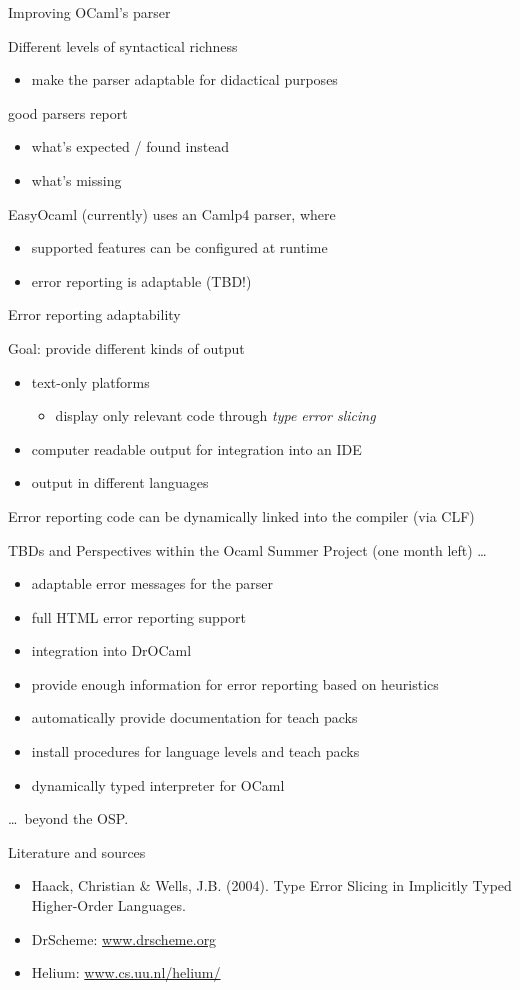 \documentclass{beamer}
\newcommand\singleitem[1]{\begin{itemize}\item #1\end{itemize}}
\begin{document}
\begin{frame} {Improving OCaml's parser}

  Different levels of syntactical richness
  \begin{itemize}\item make the parser adaptable for didactical purposes\end{itemize}

  good parsers report
  \begin{itemize}
    \item what's expected / found instead
    \item what's missing
  \end{itemize}

  EasyOcaml (currently) uses an Camlp4 parser, where
  \begin{itemize}
    \item supported features can be configured at runtime
    \item error reporting is adaptable (TBD!)
  \end{itemize}
\end{frame}


\begin{frame} {Error reporting adaptability}

  Goal: provide different kinds of output
  \begin{itemize}
    \item text-only platforms
      \singleitem{display only relevant code through \emph{type error slicing}}
    \item computer readable output for integration into an IDE
    \item output in different languages
  \end{itemize}
  
  Error reporting code can be dynamically linked into the compiler (via CLF)

\end{frame}

\begin{frame} {TBDs and Perspectives}
  within the Ocaml Summer Project (one month left) \ldots
  \begin{itemize}
    \item adaptable error messages for the parser
    \item full HTML error reporting support
    \item integration into DrOCaml
    \item provide enough information for error reporting based on heuristics
    \item automatically provide documentation for teach packs
    \item install procedures for language levels and teach packs
    \item dynamically typed interpreter for OCaml
  \end{itemize}
  \ldots\ beyond the OSP.
\end{frame}

\begin{frame}{Literature and sources}
  \begin{itemize}
    \item Haack, Christian \& Wells, J.B. (2004). Type Error Slicing in Implicitly Typed Higher-Order Languages.
    \item DrScheme: \url{www.drscheme.org}
    \item Helium: \url{www.cs.uu.nl/helium/}
  \end{itemize}
\end{frame}
\end{document}
